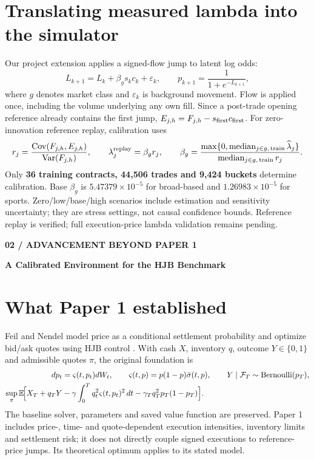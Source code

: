 \documentclass[11pt,letterpaper]{article}
\newcommand{\Cov}{\operatorname{Cov}}
\newcommand{\Var}{\operatorname{Var}}
\newcommand{\E}{\mathbb{E}}
\newcommand{\pagebanner}[2]{%
  {\sffamily\footnotesize\bfseries\color{teal} #1\par}\vspace{3pt}%
  {\sffamily\fontsize{20}{23}\selectfont\bfseries\color{navy} #2\par}\vspace{5pt}}
\begin{document}
\section{Translating measured lambda into the simulator}
Our project extension applies a signed-flow jump to latent log odds:
\begin{equation}
 L_{k+1}=L_k+\beta_g s_kc_k+\varepsilon_k,
 \qquad p_{k+1}=\frac{1}{1+e^{-L_{k+1}}},
 \label{eq:impact}
\end{equation}
where $g$ denotes market class and $\varepsilon_k$ is background movement. Flow is applied once, including the volume underlying any own fill. Since a post-trade opening reference already contains the first jump, $E_{j,h}=F_{j,h}-s_{\rm first}c_{\rm first}$. For zero-innovation reference replay, calibration uses
\begin{equation}
 r_j=\frac{\Cov(F_{j,h},E_{j,h})}{\Var(F_{j,h})},\qquad
 \lambda_j^{\rm replay}=\beta_g r_j,\qquad
 \beta_g=\frac{\max\{0,\operatorname{median}_{j\in g,\,\mathrm{train}}\widehat\lambda_j\}}
 {\operatorname{median}_{j\in g,\,\mathrm{train}}r_j}.
 \label{eq:mapping}
\end{equation}
Only \textbf{36 training contracts, 44,506 trades and 9,424 buckets} determine calibration. Base $\beta_g$ is $5.47379\times10^{-5}$ for broad-based and $1.26983\times10^{-5}$ for sports. Zero/low/base/high scenarios include estimation and sensitivity uncertainty; they are stress settings, not causal confidence bounds. Reference replay is verified; full execution-price lambda validation remains pending.

\newpage
\pagebanner{02 / ADVANCEMENT BEYOND PAPER 1}{A Calibrated Environment for the HJB Benchmark}

\section{What Paper 1 established}
Feil and Nendel model price as a conditional settlement probability and optimize bid/ask quotes using HJB control \cite{feil}. With cash $X$, inventory $q$, outcome $Y\in\{0,1\}$ and admissible quotes $\pi$, the original foundation is
\begin{align}
 dp_t&=\varsigma(t,p_t)dW_t,
 \qquad \varsigma(t,p)=p(1-p)\bar\sigma(t,p),
 \qquad Y\mid\mathcal F_T\sim\operatorname{Bernoulli}(p_T), \label{eq:paper1price}\\
 \sup_{\pi}\E\!\Bigl[X_T+q_TY
 &-\gamma\int_0^T q_t^2\varsigma(t,p_t)^2\,dt
 -\gamma_Tq_T^2p_T(1-p_T)\Bigr]. \label{eq:paper1objective}
\end{align}
The baseline solver, parameters and saved value function are preserved. Paper 1 includes price-, time- and quote-dependent execution intensities, inventory limits and settlement risk; it does not directly couple signed executions to reference-price jumps. Its theoretical optimum applies to its stated model.
\end{document}
